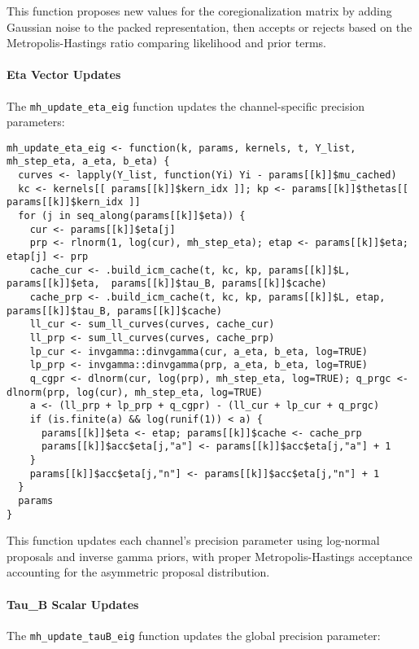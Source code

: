 \documentclass[11pt]{article}
\begin{document}
This function proposes new values for the coregionalization matrix by adding Gaussian noise to the packed representation, then accepts or rejects based on the Metropolis-Hastings ratio comparing likelihood and prior terms.

\paragraph{Eta Vector Updates}

The \texttt{mh\_update\_eta\_eig} function updates the channel-specific precision parameters:

\begin{lstlisting}
mh_update_eta_eig <- function(k, params, kernels, t, Y_list, mh_step_eta, a_eta, b_eta) {
  curves <- lapply(Y_list, function(Yi) Yi - params[[k]]$mu_cached)
  kc <- kernels[[ params[[k]]$kern_idx ]]; kp <- params[[k]]$thetas[[ params[[k]]$kern_idx ]]
  for (j in seq_along(params[[k]]$eta)) {
    cur <- params[[k]]$eta[j]
    prp <- rlnorm(1, log(cur), mh_step_eta); etap <- params[[k]]$eta; etap[j] <- prp
    cache_cur <- .build_icm_cache(t, kc, kp, params[[k]]$L, params[[k]]$eta,  params[[k]]$tau_B, params[[k]]$cache)
    cache_prp <- .build_icm_cache(t, kc, kp, params[[k]]$L, etap,               params[[k]]$tau_B, params[[k]]$cache)
    ll_cur <- sum_ll_curves(curves, cache_cur)
    ll_prp <- sum_ll_curves(curves, cache_prp)
    lp_cur <- invgamma::dinvgamma(cur, a_eta, b_eta, log=TRUE)
    lp_prp <- invgamma::dinvgamma(prp, a_eta, b_eta, log=TRUE)
    q_cgpr <- dlnorm(cur, log(prp), mh_step_eta, log=TRUE); q_prgc <- dlnorm(prp, log(cur), mh_step_eta, log=TRUE)
    a <- (ll_prp + lp_prp + q_cgpr) - (ll_cur + lp_cur + q_prgc)
    if (is.finite(a) && log(runif(1)) < a) { 
      params[[k]]$eta <- etap; params[[k]]$cache <- cache_prp
      params[[k]]$acc$eta[j,"a"] <- params[[k]]$acc$eta[j,"a"] + 1 
    }
    params[[k]]$acc$eta[j,"n"] <- params[[k]]$acc$eta[j,"n"] + 1
  }
  params
}
\end{lstlisting}

This function updates each channel's precision parameter using log-normal proposals and inverse gamma priors, with proper Metropolis-Hastings acceptance accounting for the asymmetric proposal distribution.

\paragraph{Tau\_B Scalar Updates}

The \texttt{mh\_update\_tauB\_eig} function updates the global precision parameter:
\end{document}
